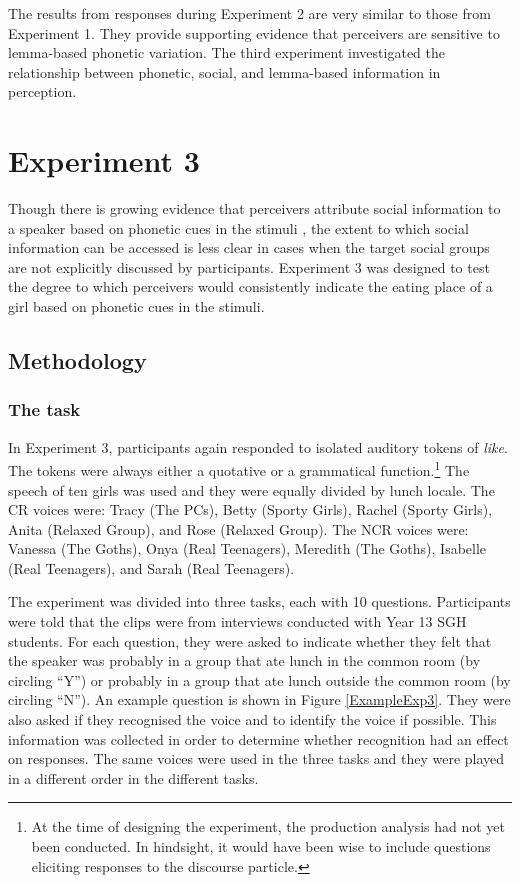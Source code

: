 The results from responses during Experiment 2 are very similar to those from Experiment 1.  They provide supporting evidence that perceivers are sensitive to lemma-based phonetic variation.  The third experiment investigated the relationship between phonetic, social, and lemma-based information in perception.  


\section{Experiment 3} 

Though there is growing evidence that perceivers attribute social information to a speaker based on phonetic cues in the stimuli \cite{gilespowesland1975,bayard2000,campbellkibler2007}, the extent to which social information can be accessed is less clear in cases when the target social groups are not explicitly discussed by participants.  Experiment 3 was designed to test the degree to which perceivers would consistently indicate the eating place of a girl based on phonetic cues in the stimuli.

\subsection{Methodology}

\subsubsection{The task}

In Experiment 3, participants again responded to isolated auditory tokens of \textit{like}.  The tokens were always either a quotative or a grammatical function.\footnote{At the time of designing the experiment, the production analysis had not yet been conducted.  In hindsight, it would have been wise to include questions eliciting responses to the discourse particle.}  The speech of ten girls was used and they were equally divided by lunch locale.  The CR voices were: Tracy (The PCs), Betty (Sporty Girls), Rachel (Sporty Girls), Anita (Relaxed Group), and Rose (Relaxed Group).  The NCR voices were: Vanessa (The Goths), Onya (Real Teenagers), Meredith (The Goths), Isabelle (Real Teenagers), and Sarah (Real Teenagers).  

The experiment was divided into three tasks, each with 10 questions.  Participants were told that the clips were from interviews conducted with Year 13 SGH students.  For each question, they were asked to indicate whether they felt that the speaker was probably in a group that ate lunch in the common room (by circling ``Y'') or probably in a group that ate lunch outside the common room (by circling ``N'').  An example question is shown in Figure \ref{ExampleExp3}.   They were also asked if they recognised the voice and to identify the voice if possible.  This information was collected in order to determine whether recognition had an effect on responses.  The same voices were used in the three tasks and they were played in a different order in the different tasks. 



